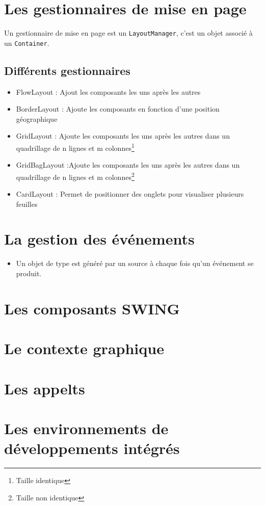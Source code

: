 \documentclass[12pt,a4paper,openany]{report}
\begin{document}
	\section{Les gestionnaires de mise en page}
	Un gestionnaire de mise en page est un \texttt{LayoutManager}, c'est un objet associé à un \texttt{Container}.
	\subsection{Différents gestionnaires}
	\begin{itemize}
		\item FlowLayout : Ajout les composants les uns après les autres
		\item BorderLayout : Ajoute les composants en fonction d'une position géographique
		\item GridLayout : Ajoute les composants les uns après les autres dans un quadrillage de n lignes et m colonnes\footnote{Taille identique}
		\item GridBagLayout :Ajoute les composants les uns après les autres dans un quadrillage de n lignes et m colonnes\footnote{Taille non identique} 
		\item CardLayout : Permet de positionner des onglets pour visualiser plusieurs feuilles
	\end{itemize}
	\section{La gestion des événements}
	\begin{itemize}
		\item Un objet de type  est généré par un source à chaque fois qu'un événement se produit.
	\end{itemize}
	\section{Les composants SWING}
	\section{Le contexte graphique}
	\section{Les appelts}
	\section{Les environnements de développements intégrés}
	
\end{document}
